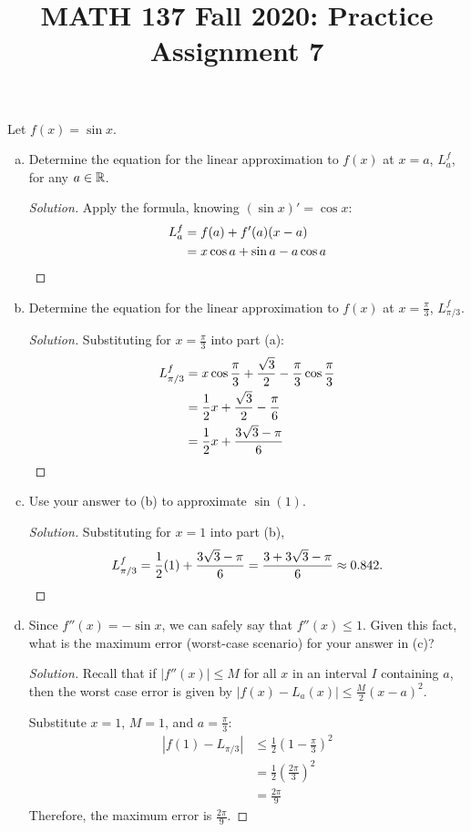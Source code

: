 
\title{MATH 137 Fall 2020: Practice Assignment 7}


\thispagestyle{firstpage}

\textbf{\@title}

\question Let $f(x)=\sin x$.
\begin{enumerate}[(a)]
  \item Determine the equation for the linear approximation to $f(x)$ at $x=a$, $L^f_a$, for any $a\in\mathbb{R}$.
        \begin{proof}[Solution]
          Apply the formula, knowing $(\sin x)' = \cos x$:
          \begin{align*}
            L^f_a & = f(a)+f'(a)(x-a)                     \\
                  & = x\cos a + \sin a - a\cos a \qedhere
          \end{align*}
        \end{proof}
  \item Determine the equation for the linear approximation to $f(x)$ at $x=\frac\pi3$, $L^f_{\pi/3}$.
        \begin{proof}[Solution]
          Substituting for $x=\frac\pi3$ into part (a):
          \begin{align*}
            L^f_{\pi/3} & = x\cos\frac\pi3 + \frac{\sqrt3}{2} - \frac\pi3\cos\frac\pi3 \\
                        & = \frac12x + \frac{\sqrt3}{2} - \frac\pi6                    \\
                        & = \frac12x + \frac{3\sqrt3 - \pi}{6} \qedhere
          \end{align*}
        \end{proof}
  \item Use your answer to (b) to approximate $\sin(1)$.
        \begin{proof}[Solution]
          Substituting for $x=1$ into part (b),
          \[ L^f_{\pi/3}=\frac12(1) + \frac{3\sqrt3 - \pi}{6} =\dfrac{3+3\sqrt3-\pi}{6} \approx 0.842. \qedhere \]
        \end{proof}
  \item Since $f''(x)=-\sin x$, we can safely say that $f''(x) \leq 1$.
        Given this fact, what is the maximum error (worst-case scenario) for your answer in (c)?
        \begin{proof}[Solution]
          Recall that if $|f''(x)| \leq M$ for all $x$ in an interval $I$ containing $a$,
          then the worst case error is given by $|f(x)-L_a(x)| \leq \frac{M}{2}(x-a)^2$.

          Substitute $x=1$, $M=1$, and $a=\frac\pi3$:
          \begin{align*}
            |f(1)-L_{\pi/3}| & \leq \frac12(1-\frac\pi3)^2 \\
                             & = \frac12(\frac{2\pi}{3})^2 \\
                             & = \frac{2\pi}{9}
          \end{align*}
          Therefore, the maximum error is $\frac{2\pi}{9}$.
        \end{proof}
\end{enumerate}


